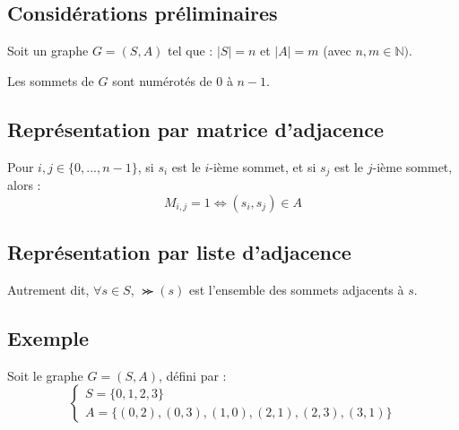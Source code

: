 

\subsection{Considérations préliminaires}

Soit un graphe $G=(S,A)$ tel que : $|S|=n$ et $|A|=m$ 
(avec $n,m\in\mathbb{N})$.

\noindent
Les sommets de $G$ sont numérotés de $0$ à $n-1$.

\subsection{Représentation par matrice d'adjacence}


Pour $i,j \in \{0, ..., n-1\}$, 
si $s_i$ est le $i$-ième sommet, 
et si $s_j$ est le $j$-ième sommet, 
alors : 
$$
M_{i, j} = 1 \iff (s_i, s_j)\in A
$$


\subsection{Représentation par liste d'adjacence}

Autrement dit, $\forall s\in S$, 
$\Succ(s)$ est l'ensemble des sommets adjacents à $s$. 

\subsection{Exemple}

Soit le graphe $G=(S,A)$, défini par :
$$
\left\{
	\begin{array}{l}
		S=\{0, 1, 2, 3\}\\
		A=\{(0,2), (0,3), (1, 0), (2,1), (2,3), (3,1)\}
    \end{array}
\right.
$$

